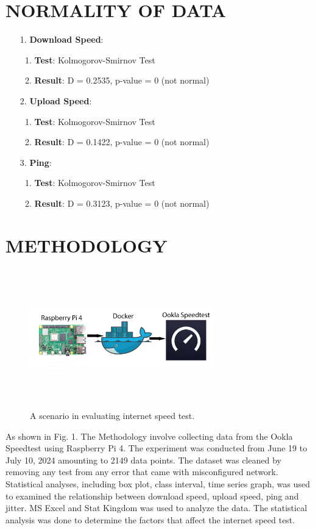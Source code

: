 \documentclass[conference]{IEEEtran}
\begin{document}
\section{NORMALITY OF DATA}
\begin{enumerate}
    \item[1.]    
    \textbf{Download Speed}: 
    \begin{enumerate}
        \item \textbf{Test}: Kolmogorov-Smirnov Test
        \item \textbf{Result}: D = 0.2535, p-value = 0 (not normal)
    \end{enumerate}

    \item[2.]
    \textbf{Upload Speed}:
    \begin{enumerate}
        \item \textbf{Test}: Kolmogorov-Smirnov Test
        \item \textbf{Result}: D = 0.1422, p-value = 0 (not normal)
    \end{enumerate}

    \item[3.]
    \textbf{Ping}:
    \begin{enumerate}
        \item \textbf{Test}: Kolmogorov-Smirnov Test
        \item \textbf{Result}: D = 0.3123, p-value = 0 (not normal)
    \end{enumerate}
\end{enumerate}

\section{METHODOLOGY}
\begin{figure}[!htbp]
\centerline{\includegraphics[width=8cm,height=6cm,keepaspectratio]{Figures/Picture0.png}}
\caption{A scenario in evaluating internet speed test.}
\label{fig1}
\end{figure}
As shown in Fig. 1. The Methodology involve collecting data from the Ookla Speedtest using Raspberry Pi 4.
The experiment was conducted from June 19 to July 10, 2024 amounting to 2149 data points. The dataset was cleaned by removing any test from any error that came with misconfigured network.
Statistical analyses, including box plot, class interval, time series graph, was used to examined the relationship between download speed, upload speed, ping and jitter.
MS Excel and Stat Kingdom was used to analyze the data. The statistical analysis was done to determine the factors that affect the internet speed test.
\end{document}
